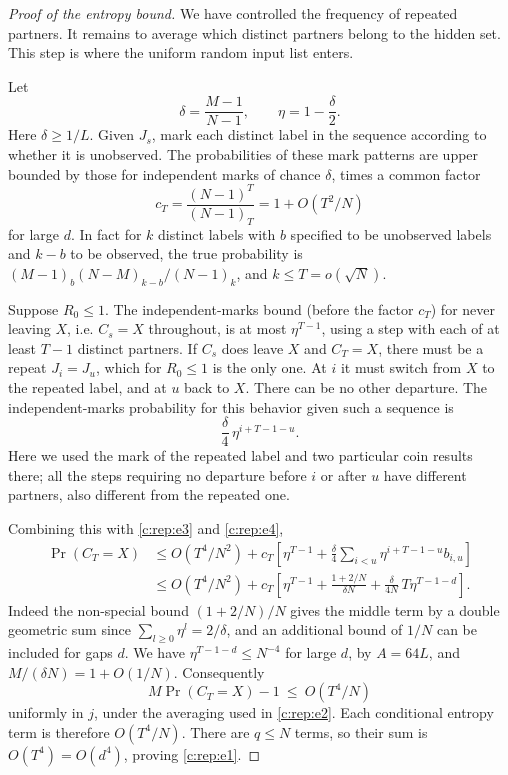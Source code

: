 \begin{proof}[Proof of the entropy bound]
We have controlled the frequency of repeated partners. It remains to
average which distinct partners belong to the hidden set. This step is
where the uniform random input list enters.

Let
\[
\delta=\frac{M-1}{N-1},\qquad \eta=1-\frac{\delta}{2}.
\]
Here \(\delta\ge 1/L\). Given \(J_s\), mark each distinct label in the
sequence according to whether it is unobserved. The probabilities of these
mark patterns are upper bounded by those for independent marks of chance
\(\delta\), times a common factor
\[
c_T=\frac{(N-1)^T}{(N-1)_T}=1+O(T^2/N)
\]
for large \(d\). In fact for \(k\) distinct labels with \(b\) specified to be unobserved labels and
\(k-b\) to be observed, the true probability is \((M-1)_b(N-M)_{k-b}/(N-1)_k\), and \(k\le
T=o(\sqrt N)\).

Suppose \(R_0\le 1\). The independent-marks bound (before the factor \(c_T\)) for never leaving
\(X\), i.e. \(C_s=X\) throughout, is at most \(\eta^{T-1}\), using a step with each of at least
\(T-1\) distinct partners. If \(C_s\) does leave \(X\) and \(C_T=X\), there must be a repeat
\(J_i=J_u\), which for \(R_0\le 1\) is the only one. At \(i\) it must switch from \(X\) to the
repeated label, and at \(u\) back to \(X\). There can be no other departure. The
independent-marks probability for this behavior given such a sequence is
\[
\frac{\delta}{4}\,\eta^{i+T-1-u}.
\]
Here we used the mark of the repeated label and two particular coin results there; all the
steps requiring no departure before \(i\) or after \(u\) have different partners, also
different from the repeated one.

Combining this with \eqref{c:rep:e3} and \eqref{c:rep:e4},
\[
\begin{aligned}
\Pr(C_T=X)
 &\le O(T^4/N^2)+c_T\left[\eta^{T-1}
       +\frac{\delta}{4}\sum_{i<u}\eta^{i+T-1-u} b_{i,u}\right]\\
 &\le O(T^4/N^2)+c_T\left[\eta^{T-1}
       +\frac{1+2/N}{\delta N}
       +\frac{\delta}{4N}\,T\eta^{T-1-d}\right].
\end{aligned}
\]
Indeed the non-special bound \((1+2/N)/N\) gives the middle term by a double geometric sum
since \(\sum_{l\ge 0}\eta^l=2/\delta\), and an additional bound of \(1/N\) can be included for
gaps \(d\). We have \(\eta^{T-1-d}\le N^{-4}\) for large \(d\), by \(A=64L\), and \(M/(\delta
N)=1+O(1/N)\). Consequently
\[
M\Pr(C_T=X)-1\ \le\ O(T^4/N)
\]
uniformly in \(j\), under the averaging used in \eqref{c:rep:e2}.
Each conditional entropy term is therefore $O(T^4/N)$. There are
$q\le N$ terms, so their sum is $O(T^4)=O(d^4)$, proving
\eqref{c:rep:e1}.
\end{proof}

